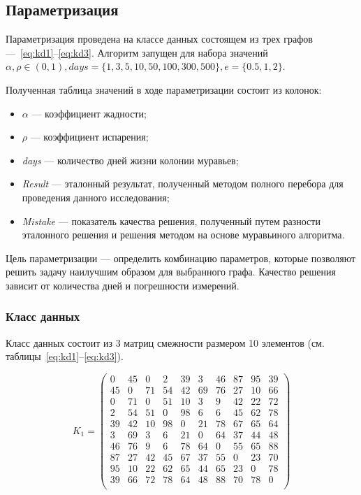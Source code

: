 \subsection{Параметризация}

Параметризация проведена на классе данных состоящем из трех графов ---~\ref{eq:kd1}--\ref{eq:kd3}. Алгоритм запущен для набора значений $\alpha, \rho \in (0, 1), days = \{1, 3, 5, 10, 50, 100, 300, 500\}, e = \{0.5, 1, 2\}$.

Полученная таблица значений в ходе параметризации состоит из колонок:
\begin{itemize}[label=---]
	\item $\alpha$ --- коэффициент жадности;
	\item $\rho$ --- коэффициент испарения;
	\item \textit{days} --- количество дней жизни колонии муравьев;
	\item \textit{Result} --- эталонный результат, полученный методом полного перебора для проведения данного исследования;
	\item \textit{Mistake} --- показатель качества решения, полученный путем разности эталонного решения и решения методом на основе муравьиного алгоритма.
\end{itemize}

Цель параметризации --- определить комбинацию параметров, которые позволяют решить задачу наилучшим образом для выбранного графа. Качество решения зависит от количества дней и погрешности измерений.

\subsubsection{Класс данных}
Класс данных состоит из 3 матриц смежности размером 10 элементов (см. таблицы~\ref{eq:kd1}--\ref{eq:kd3}).

\begin{equation}
    \label{eq:kd1}
	K_{1} = \begin{pmatrix}
0 & 45 & 0 & 2 & 39 & 3 & 46 & 87 & 95 & 39  \\
45 & 0 & 71 & 54 & 42 & 69 & 76 & 27 & 10 & 66  \\
0 & 71 & 0 & 51 & 10 & 3 & 9 & 42 & 22 & 72  \\
2 & 54 & 51 & 0 & 98 & 6 & 6 & 45 & 62 & 78  \\
39 & 42 & 10 & 98 & 0 & 21 & 78 & 67 & 65 & 64  \\
3 & 69 & 3 & 6 & 21 & 0 & 64 & 37 & 44 & 48  \\
46 & 76 & 9 & 6 & 78 & 64 & 0 & 55 & 65 & 88  \\
87 & 27 & 42 & 45 & 67 & 37 & 55 & 0 & 23 & 70  \\
95 & 10 & 22 & 62 & 65 & 44 & 65 & 23 & 0 & 78  \\
39 & 66 & 72 & 78 & 64 & 48 & 88 & 70 & 78 &  0 \\
	\end{pmatrix}
\end{equation}


